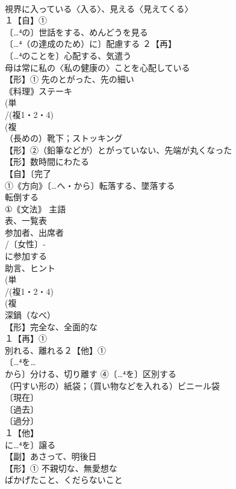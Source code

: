 \documentclass[8pt]{extreport}
\begin{document}
\begin{CJK}{UTF8}{min}
\\	視界に入っている〈入る〉、見える〈見えてくる〉
\\	１【自】①
\\	〔…⁴の〕世話をする、めんどうを見る 
\\	〔…⁴（の達成のため）に〕配慮する ２【再】
\\	〔…⁴のことを〕心配する、気遣う 
\\	母は常に私の〈私の健康の〉ことを心配している
\\	【形】① 先のとがった、先の細い 
\\	｟料理｠ステーキ
\\	(単
\\	/(複1・2・4)
\\	(複
\\	（長めの）靴下；ストッキング 
\\	【形】②（鉛筆などが）とがっていない、先端が丸くなった
\\	【形】数時間にわたる
\\	【自】〔完了
\\	①《方向》〔…へ・から〕転落する、墜落する 
\\	転倒する
\\	①｟文法｠ 主語
\\	表、一覧表
\\	参加者、出席者 
\\	/〔女性〕‐
\\	に参加する
\\	助言、ヒント　
\\	(単
\\	/(複1・2・4)
\\	(複
\\	深鍋（なべ） 
\\	【形】完全な、全面的な
\\	１【再】①
\\	別れる、離れる２【他】①
\\	〔…⁴を…
\\	から〕分ける、切り離す ④〔…⁴を〕区別する
\\	（円すい形の）紙袋；（買い物などを入れる）ビニール袋 
\\	〔現在〕
\\	〔過去〕
\\	〔過分〕
\\	１【他】
\\	に…⁴を〕譲る
\\	【副】あさって、明後日
\\	【形】① 不親切な、無愛想な 
\\	ばかげたこと、くだらないこと 

\end{CJK}
\end{document}
